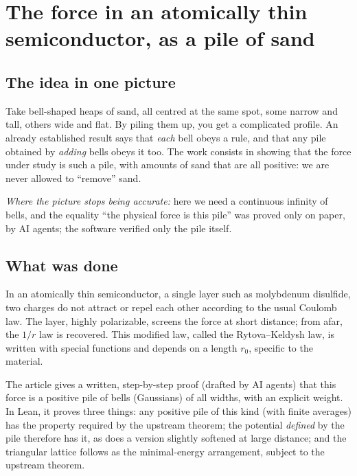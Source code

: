 \chapter[A force as a pile of sand]{The force in an atomically thin semiconductor, as a pile of sand}

\section*{The idea in one picture}

\begin{analogie}
Take bell-shaped heaps of sand, all centred at the same spot, some narrow and tall, others wide and flat. By piling
them up, you get a complicated profile. An already established result says that \emph{each} bell obeys a rule, and
that any pile obtained by \emph{adding} bells obeys it too. The work consists in showing that the force under study
is such a pile, with amounts of sand that are all positive: we are never allowed to ``remove'' sand.

\emph{Where the picture stops being accurate:} here we need a continuous infinity of bells, and the equality ``the
physical force is this pile'' was proved only on paper, by AI agents; the software verified only the pile itself.
\end{analogie}

\section*{What was done}

In an atomically thin semiconductor, a single layer such as molybdenum disulfide, two charges do not attract or
repel each other according to the usual Coulomb law. The layer, highly polarizable, screens the force at short
distance; from afar, the $1/r$ law is recovered. This modified law, called the Rytova--Keldysh law, is written
with special functions and depends on a length $r_0$, specific to the material.

The article gives a written, step-by-step proof (drafted by AI agents) that this force is a positive pile of bells (Gaussians) of all
widths, with an explicit weight. In Lean, it proves three things: any positive pile of this kind (with finite
averages) has the property required by the upstream theorem; the potential \emph{defined} by the pile therefore has
it, as does a version slightly softened at large distance; and the triangular lattice follows as the
minimal-energy arrangement, subject to the upstream theorem.

